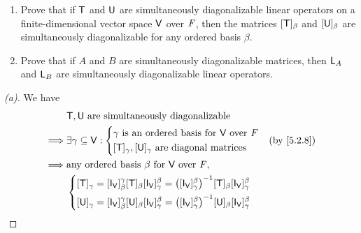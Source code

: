 \begin{ex}\label{ex:5.2.17}
	\begin{enumerate}
		\item Prove that if \(\mathsf{T}\) and \(\mathsf{U}\) are simultaneously diagonalizable linear operators on a finite-dimensional vector space \(\mathsf{V}\) over \(\mathit{F}\), then the matrices \([\mathsf{T}]_{\beta}\) and \([\mathsf{U}]_{\beta}\) are simultaneously diagonalizable for any ordered basis \(\beta\).
		\item Prove that if \(A\) and \(B\) are simultaneously diagonalizable matrices, then \(\mathsf{L}_A\) and \(\mathsf{L}_B\) are simultaneously diagonalizable linear operators.
	\end{enumerate}
\end{ex}

\begin{proof}[(a)]
	We have
	\begin{align*}
		         & \T, \U \text{ are simultaneously diagonalizable}                                                                                                                                                                                                  \\
		\implies & \exists \gamma \subseteq \V : \begin{dcases}
			                                         \gamma \text{ is an ordered basis for } \V \text{ over } \F \\
			                                         [\T]_{\gamma}, [\U]_{\gamma} \text{ are diagonal matrices}
		                                         \end{dcases}                                                                                                                                                                    &  & \by{5.2.8}                     \\
		\implies & \text{any ordered basis } \beta \text{ for } \V \text{ over } \F,                                                                                                                                                                                 \\
		         & \begin{dcases}
			           [\T]_{\gamma} = [\IT[\V]]_{\beta}^{\gamma} [\T]_{\beta} [\IT[\V]]_{\gamma}^{\beta} = \pa{[\IT[\V]]_{\gamma}^{\beta}}^{-1} [\T]_{\beta} [\IT[\V]]_{\gamma}^{\beta} \\
			           [\U]_{\gamma} = [\IT[\V]]_{\beta}^{\gamma} [\U]_{\beta} [\IT[\V]]_{\gamma}^{\beta} = \pa{[\IT[\V]]_{\gamma}^{\beta}}^{-1} [\U]_{\beta} [\IT[\V]]_{\gamma}^{\beta}

\end{dcases}
\end{align*}
\end{proof}
